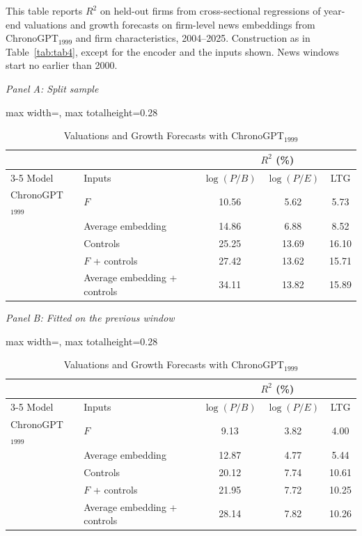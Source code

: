 \begin{table}[htbp]
\centering
\caption{Valuations and Growth Forecasts with ChronoGPT$_{1999}$}
\label{tab:tabB_representation}
\begin{minipage}{\linewidth}\footnotesize
This table reports $R^2$ on held-out firms from cross-sectional regressions of year-end valuations and growth forecasts on firm-level news embeddings from ChronoGPT$_{1999}$ and firm characteristics, 2004--2025. Construction as in Table~\ref{tab:tab4}, except for the encoder and the inputs shown. News windows start no earlier than 2000.
\end{minipage}
\medskip

{\footnotesize
\textit{Panel A: Split sample}\\[2pt]
\begin{adjustbox}{max width=\linewidth, max totalheight=0.28\textheight}
\begin{tabular}{llccc}
\toprule
\multicolumn{2}{c}{} & \multicolumn{3}{c}{$R^2$ (\%)} \\
\cmidrule(lr){3-5}
Model & Inputs & $\log(P/B)$ & $\log(P/E)$ & LTG \\
\midrule
ChronoGPT$_{1999}$ & $F$ & 10.56 & \phantom{0}5.62 & \phantom{0}5.73 \\
 & Average embedding & 14.86 & \phantom{0}6.88 & \phantom{0}8.52 \\
 & Controls & 25.25 & 13.69 & 16.10 \\
 & $F$ + controls & 27.42 & 13.62 & 15.71 \\
 & Average embedding + controls & 34.11 & 13.82 & 15.89 \\
\bottomrule
\end{tabular}
\end{adjustbox}
\par\medskip
\textit{Panel B: Fitted on the previous window}\\[2pt]
\begin{adjustbox}{max width=\linewidth, max totalheight=0.28\textheight}
\begin{tabular}{llccc}
\toprule
\multicolumn{2}{c}{} & \multicolumn{3}{c}{$R^2$ (\%)} \\
\cmidrule(lr){3-5}
Model & Inputs & $\log(P/B)$ & $\log(P/E)$ & LTG \\
\midrule
ChronoGPT$_{1999}$ & $F$ & \phantom{0}9.13 & 3.82 & \phantom{0}4.00 \\
 & Average embedding & 12.87 & 4.77 & \phantom{0}5.44 \\
 & Controls & 20.12 & 7.74 & 10.61 \\
 & $F$ + controls & 21.95 & 7.72 & 10.25 \\
 & Average embedding + controls & 28.14 & 7.82 & 10.26 \\
\bottomrule
\end{tabular}
\end{adjustbox}
}
\end{table}
